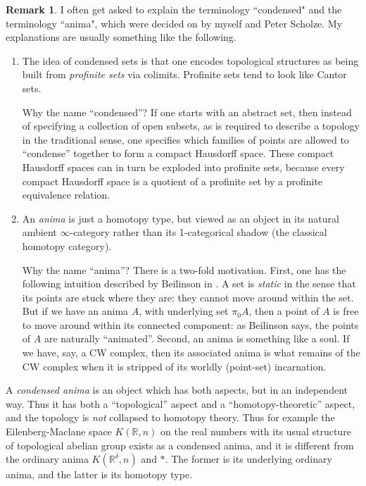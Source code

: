 \documentclass[12pt]{article}
\theoremstyle{definition}
\newtheorem{remark}[theorem]{Remark}
\newcommand{\mbb}{\mathbb}
\begin{document}
\begin{remark}
I often get asked to explain the terminology ``condensed" and the terminology ``anima", which were decided on by myself and Peter Scholze.  My explanations are usually something like the following.

\begin{enumerate}
\item The idea of condensed sets is that one encodes topological structures as being built from \emph{profinite sets} via colimits.  Profinite sets tend to look like Cantor sets.

Why the name ``condensed''? If one starts with an abstract set, then instead of specifying a collection of open subsets, as is required to describe a topology in the traditional sense, one specifies which families of points are allowed to ``condense'' together to form a compact Hausdorff space.  These compact Hausdorff spaces can in turn be exploded into profinite sets, because every compact Hausdorff space is a quotient of a profinite set by a profinite equivalence relation.

\item An \emph{anima} is just a homotopy type, but viewed as an object in its natural ambient $\infty$-category rather than its 1-categorical shadow (the classical homotopy category).

Why the name ``anima''?  There is a two-fold motivation.  First, one has the following intuition described by Beilinson in \cite{beilinson}.  A set is \emph{static} in the sense that its points are stuck where they are: they cannot move around within the set.  But if we have an anima $A$, with underlying set $\pi_0A$, then a point of $A$ is free to move around within its connected component: as Beilinson says, the points of $A$ are naturally ``animated''.  Second, an anima is something like a soul.  If we have, say, a CW complex, then its associated anima is what remains of the CW complex when it is stripped of its worldly (point-set) incarnation.
\end{enumerate}

A \emph{condensed anima} is an object which has both aspects, but in an independent way.  Thus it has both a ``topological'' aspect and a ``homotopy-theoretic'' aspect, and the topology is \emph{not} collapsed to homotopy theory.  Thus for example the Eilenberg-Maclane space $K(\mbb{R},n)$ on the real numbers with its usual structure of topological abelian group exists as a condensed anima, and it is different from the ordinary anima $K(\mbb{R}^\delta,n)$ and $\ast$.  The former is its underlying ordinary anima, and the latter is its homotopy type.

\end{remark}
\end{document}
